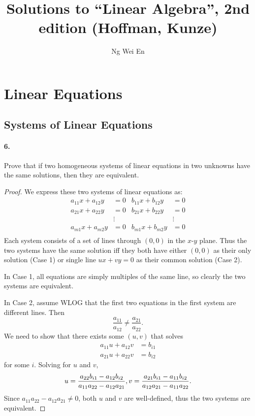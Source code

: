 \documentclass{article}
\title{Solutions to ``Linear Algebra'', 2nd edition (Hoffman, Kunze)}
\author{Ng Wei En}
\begin{document}
\maketitle
\tableofcontents
\newpage

\section{Linear Equations}

\setcounter{subsection}{1}
\subsection{Systems of Linear Equations}

\paragraph{6.} Prove that if two homogeneous systems of linear equations in two
unknowns have the same solutions, then they are equivalent.

\begin{proof}
  We express these two systems of linear equations as:
  \begin{align*}
    a_{11}x + a_{12}y &= 0 & b_{11}x + b_{12}y &= 0 \\
    a_{21}x + a_{22}y &= 0 & b_{21}x + b_{22}y &= 0 \\
    &\vdots & &\vdots \\
    a_{m1}x + a_{m2}y &= 0 & b_{m1}x + b_{m2}y &= 0 \\
  \end{align*}
  Each system consists of a set of lines through $(0, 0)$ in the $x$-$y$ plane.
  Thus the two systems have the same solution iff they both have either $(0, 0)$
  as their only solution (Case 1) or single line $ux + vy = 0$ as their common
  solution (Case 2).

  In Case 1, all equations are simply multiples of the same line, so clearly the
  two systems are equivalent.

  In Case 2, assume WLOG that the first two equations in the first system are
  different lines. Then \[
    \frac{a_{11}}{a_{12}} \neq \frac{a_{21}}{a_{22}}.
  \] We need to show that there exists some $(u, v)$ that solves
  \begin{align*}
    a_{11}u + a_{12}v &= b_{i1} \\
    a_{21}u + a_{22}v &= b_{i2}
  \end{align*}
  for some $i$. Solving for $u$ and $v$, \[
    u = \frac{a_{22}b_{i1} - a_{12}b_{i2}}{a_{11}a_{22} - a_{12}a_{21}}, \\
    v = \frac{a_{21}b_{i1} - a_{11}b_{i2}}{a_{12}a_{21} - a_{11}a_{22}}.
  \] Since $a_{11}a_{22} - a_{12}a_{21} \neq 0$, both $u$ and $v$ are
  well-defined, thus the two systems are equivalent.
\end{proof}
\end{document}
